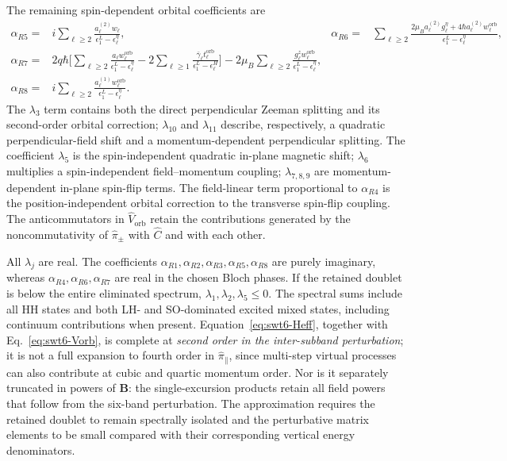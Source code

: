 \documentclass[10pt,letterpaper]{article}
\newcommand{\ep}{\epsilon}
\begin{document}
The remaining spin-dependent orbital coefficients are
\begin{align}
 \alpha_{R5}={}&i\sum_{\ell\ge2}
 \frac{a_\ell^{(2)}w_\ell}{\ep_1^L-\ep_\ell^\eta},
 &\alpha_{R6}={}&\sum_{\ell\ge2}
 \frac{2\mu_B a_\ell^{(2)}g_\ell^\eta
 +4\hbar a_\ell^{(2)}w_\ell^{\mathrm{orb}}}
 {\ep_1^L-\ep_\ell^\eta},\nonumber\\
 \alpha_{R7}={}&2q\hbar\Biggl[
 \sum_{\ell\ge2}\frac{a_\ell w_\ell^{\mathrm{orb}}}{\ep_1^L-\ep_\ell^\eta}
 -2\sum_{\ell\ge1}\frac{\bar\gamma_\ell t_\ell^{\mathrm{orb}}}{\ep_1^L-\ep_\ell^H}\Biggr]
 -2\mu_B\sum_{\ell\ge2}
 \frac{g_\ell^z w_\ell^{\mathrm{orb}}}{\ep_1^L-\ep_\ell^\eta},\nonumber\\
 \alpha_{R8}={}&i\sum_{\ell\ge2}
 \frac{a_\ell^{(1)}w_\ell^{\mathrm{orb}}}{\ep_1^L-\ep_\ell^\eta}.
 \label{eq:swt6-orb-alpha}
\end{align}
The $\lambda_3$ term contains both the direct perpendicular Zeeman
splitting and its second-order orbital correction; $\lambda_{10}$ and
$\lambda_{11}$ describe, respectively, a quadratic perpendicular-field
shift and a momentum-dependent perpendicular splitting. The coefficient
$\lambda_5$ is the spin-independent quadratic in-plane magnetic shift;
$\lambda_6$ multiplies a spin-independent field--momentum coupling;
$\lambda_{7,8,9}$ are momentum-dependent in-plane spin-flip terms.
The field-linear term proportional to $\alpha_{R4}$ is the
position-independent orbital correction to the transverse spin-flip
coupling. The anticommutators in $\hat V_{\mathrm{orb}}$ retain the
contributions generated by the noncommutativity of $\hat\pi_\pm$
with $\hat C$ and with each other.

All $\lambda_j$ are real. The coefficients
$\alpha_{R1},\alpha_{R2},\alpha_{R3},\alpha_{R5},\alpha_{R8}$ are
purely imaginary, whereas $\alpha_{R4},\alpha_{R6},\alpha_{R7}$
are real in the chosen Bloch phases. If the retained doublet is
below the entire eliminated spectrum, $\lambda_1,\lambda_2,\lambda_5\le0$.
The spectral sums include all HH states and both LH- and SO-dominated
excited mixed states, including continuum contributions when present.
Equation~\eqref{eq:swt6-Heff}, together with
Eq.~\eqref{eq:swt6-Vorb}, is complete at \emph{second order in the
inter-subband perturbation}; it is not a full expansion to fourth order
in $\hat\pi_\parallel$, since multi-step virtual processes can also
contribute at cubic and quartic momentum order. Nor is it separately
truncated in powers of $\bm B$: the single-excursion products retain
all field powers that follow from the six-band perturbation. The
approximation requires the retained doublet to remain spectrally
isolated and the perturbative matrix elements to be small compared
with their corresponding vertical energy denominators.
\end{document}
